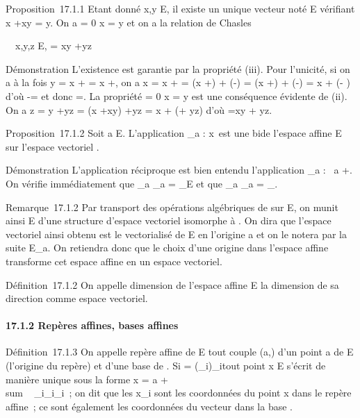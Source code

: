 \documentclass[]{article}
\begin{document}
Proposition~17.1.1 Etant donné x,y \in E, il existe un unique vecteur noté
\overrightarrowxy \in\overrightarrow
E vérifiant x +\overrightarrow xy = y. On a
\overrightarrowxy = 0 \Leftrightarrow x
= y et on a la relation de Chasles

\forall~~x,y,z \in E,
\overrightarrowxz =\overrightarrow
xy +\overrightarrow yz

Démonstration L'existence est garantie par la propriété (iii). Pour
l'unicité, si on a à la fois y = x +\overrightarrow \xi
= x +\overrightarrow \eta, on a x = x
+ = (x
+\overrightarrow \xi) +
(-\overrightarrow\xi) = (x
+\overrightarrow \eta) +
(-\overrightarrow\xi) = x +
(\overrightarrow\eta -\overrightarrow
\xi) d'où \overrightarrow\xi
-\overrightarrow \eta = et donc \overrightarrow\xi
=\overrightarrow \eta. La propriété
\overrightarrowxy = 0 \Leftrightarrow x
= y est une conséquence évidente de (ii). On a z = y
+\overrightarrow yz = (x
+\overrightarrow xy)
+\overrightarrow yz = x +
(\overrightarrowxy +\overrightarrow
yz) d'où \overrightarrowxz
=\overrightarrow xy +\overrightarrow
yz.

Proposition~17.1.2 Soit a \in E. L'application \phi\_a :
x\mapsto~\overrightarrowax est
une bi\jmathection de l'espace affine E sur l'espace vectoriel
\overrightarrowE.

Démonstration L'application réciproque est bien entendu l'application
\psi\_a :\overrightarrow
\xi\mapsto~a +\overrightarrow \xi.
On vérifie immédiatement que \psi\_a \cdot \phi\_a =
\mathrmId\_E et que \phi\_a \cdot \psi\_a
=
\mathrmId\_\overrightarrowE.

Remarque~17.1.2 Par transport des opérations algébriques de
\overrightarrowE sur E, on munit ainsi E d'une
structure d'espace vectoriel isomorphe à
\overrightarrowE. On dira que l'espace vectoriel
ainsi obtenu est le vectorialisé de E en l'origine a et on le notera par
la suite E\_a. On retiendra donc que le choix d'une origine dans
l'espace affine transforme cet espace affine en un espace vectoriel.

Définition~17.1.2 On appelle dimension de l'espace affine E la dimension
de sa direction \overrightarrowE comme espace
vectoriel.

\paragraph{17.1.2 Repères affines, bases affines}

Définition~17.1.3 On appelle repère affine de E tout couple (a,) d'un
point a de E (l'origine du repère) et d'une base  de
\overrightarrowE. Si  =
(\vece\_i)\_i\inI tout point x \in E
s'écrit de manière unique sous la forme x = a
+ \\sum ~
\_i\inIx\_i\vece\_i~; on dit que
les x\_i sont les coordonnées du point x dans le repère affine~;
ce sont également les coordonnées du vecteur
\overrightarrowax dans la base .
\end{document}
